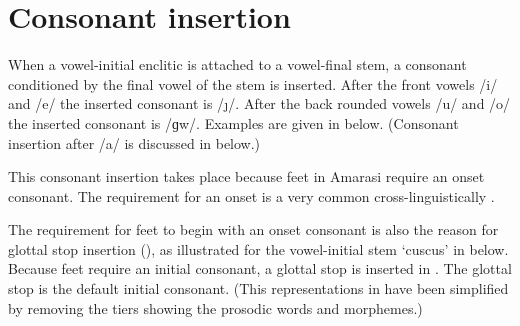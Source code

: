 \section{Consonant insertion}\label{sec:ConIns}
When a vowel-initial enclitic is attached to a vowel-final stem,
a consonant conditioned by the final vowel of the stem is inserted.
After the front vowels /i/ and /e/ the inserted consonant is /\j/.
After the back rounded vowels /u/ and /o/ the inserted consonant is /ɡw/.
Examples are given in  below.
(Consonant insertion after /a/ is discussed in  below.)

\begin{exe}
	 \label{ex:VV->VVC=V}
\end{exe}

This consonant insertion takes place because
feet in Amarasi require an onset consonant.
The requirement for an onset is a very common cross-linguistically \citep{mcpr93,prsm93}.

The requirement for feet to begin with an onset consonant
is also the reason for glottal stop insertion (),
as illustrated for the vowel-initial stem  `cuscus' in  below.
Because feet require an initial consonant, a glottal stop is inserted in .
The glottal stop is the default initial consonant.
(This representations in 
have been simplified by removing the tiers showing
the prosodic words and morphemes.)

